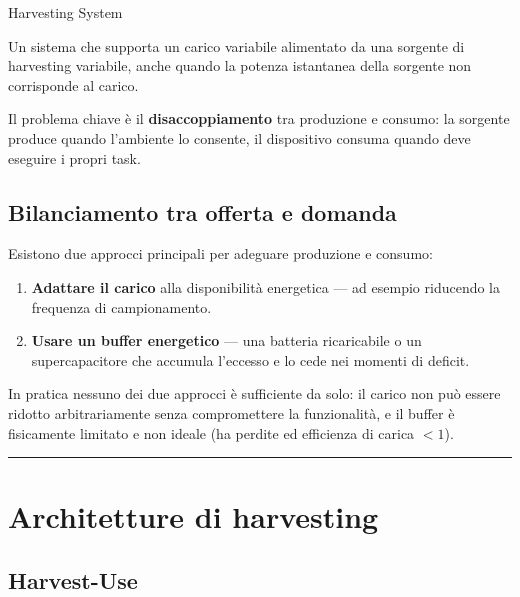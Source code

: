 \documentclass[
  italian,
  openany]{book}
\providecommand{\tightlist}{%
  \setlength{\itemsep}{0pt}\setlength{\parskip}{0pt}}
\begin{document}
\begin{calloutdefinition}{Harvesting System}

Un sistema che supporta un carico variabile alimentato da una sorgente
di harvesting variabile, anche quando la potenza istantanea della
sorgente non corrisponde al carico.

\end{calloutdefinition}

Il problema chiave è il \textbf{disaccoppiamento} tra produzione e
consumo: la sorgente produce quando l'ambiente lo consente, il
dispositivo consuma quando deve eseguire i propri task.

\subsection{Bilanciamento tra offerta e
domanda}\label{bilanciamento-tra-offerta-e-domanda}

Esistono due approcci principali per adeguare produzione e consumo:

\begin{enumerate}
\def\labelenumi{\arabic{enumi}.}
\tightlist
\item
  \textbf{Adattare il carico} alla disponibilità energetica --- ad
  esempio riducendo la frequenza di campionamento.
\item
  \textbf{Usare un buffer energetico} --- una batteria ricaricabile o un
  supercapacitore che accumula l'eccesso e lo cede nei momenti di
  deficit.
\end{enumerate}

In pratica nessuno dei due approcci è sufficiente da solo: il carico non
può essere ridotto arbitrariamente senza compromettere la funzionalità,
e il buffer è fisicamente limitato e non ideale (ha perdite ed
efficienza di carica \(< 1\)).

\begin{center}\rule{0.5\linewidth}{0.5pt}\end{center}

\section{Architetture di harvesting}\label{architetture-di-harvesting}

\subsection{Harvest-Use}\label{harvest-use}
\end{document}
